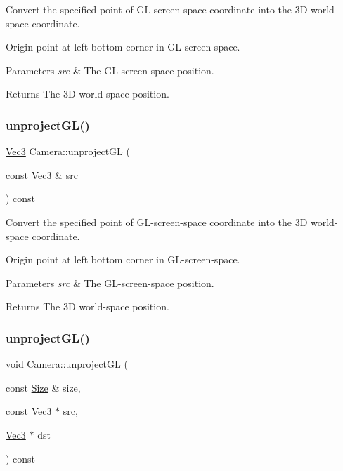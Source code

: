 Convert the specified point of G\+L-\/screen-\/space coordinate into the 3D world-\/space coordinate.

Origin point at left bottom corner in G\+L-\/screen-\/space. 
\begin{DoxyParams}{Parameters}
{\em src} & The G\+L-\/screen-\/space position. \\
\hline
\end{DoxyParams}
\begin{DoxyReturn}{Returns}
The 3D world-\/space position. 
\end{DoxyReturn}
\mbox{\label{classCamera_ac4b6f76b3c9569e12b528e423e45ea41}} 
\subsubsection{\texorpdfstring{unproject\+G\+L()}{unprojectGL()}\hspace{0.1cm}{\footnotesize\ttfamily [2/4]}}
{\footnotesize\ttfamily \hyperlink{classVec3}{Vec3} Camera\+::unproject\+GL (\begin{DoxyParamCaption}\item[{const \hyperlink{classVec3}{Vec3} \&}]{src }\end{DoxyParamCaption}) const}

Convert the specified point of G\+L-\/screen-\/space coordinate into the 3D world-\/space coordinate.

Origin point at left bottom corner in G\+L-\/screen-\/space. 
\begin{DoxyParams}{Parameters}
{\em src} & The G\+L-\/screen-\/space position. \\
\hline
\end{DoxyParams}
\begin{DoxyReturn}{Returns}
The 3D world-\/space position. 
\end{DoxyReturn}
\mbox{\label{classCamera_a2cdbc6f2403ea1f7213e5af66e31f37c}} 
\subsubsection{\texorpdfstring{unproject\+G\+L()}{unprojectGL()}\hspace{0.1cm}{\footnotesize\ttfamily [3/4]}}
{\footnotesize\ttfamily void Camera\+::unproject\+GL (\begin{DoxyParamCaption}\item[{const \hyperlink{classSize}{Size} \&}]{size,  }\item[{const \hyperlink{classVec3}{Vec3} $\ast$}]{src,  }\item[{\hyperlink{classVec3}{Vec3} $\ast$}]{dst }\end{DoxyParamCaption}) const}

